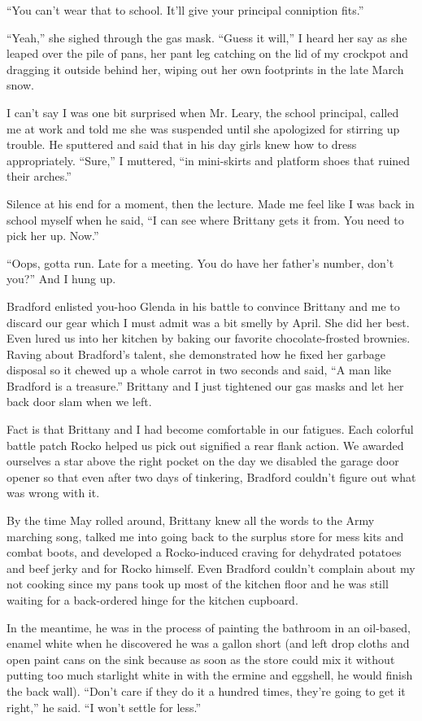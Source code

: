 \documentclass[twoside,10pt]{book}
\begin{document}
``You can't wear that to school. It'll give your principal conniption
fits.''

``Yeah,'' she sighed through the gas mask. ``Guess it will,'' I heard
her say as she leaped over the pile of pans, her pant leg catching on
the lid of my crockpot and dragging it outside behind her, wiping out
her own footprints in the late March snow.

I can't say I was one bit surprised when Mr. Leary, the school
principal, called me at work and told me she was suspended until she
apologized for stirring up trouble. He sputtered and said that in his
day girls knew how to dress appropriately. ``Sure,'' I muttered, ``in
mini-skirts and platform shoes that ruined their arches.''

Silence at his end for a moment, then the lecture. Made me feel like I
was back in school my­self when he said, ``I can see where Brittany gets
it from. You need to pick her up. Now.''

``Oops, gotta run. Late for a meeting. You do have her father's number,
don't you?'' And I hung up.

Bradford enlisted you-hoo Glenda in his battle to convince Brittany and
me to discard our gear which I must admit was a bit smelly by April. She
did her best. Even lured us into her kitchen by baking our favorite
chocolate-frosted brownies. Raving about Bradford's talent, she
demonstrated how he fixed her garbage disposal so it chewed up a whole
carrot in two seconds and said, ``A man like Bradford is a treasure.''
Brittany and I just tightened our gas masks and let her back door slam
when we left.

Fact is that Brittany and I had become comfortable in our fatigues. Each
colorful battle patch Rocko helped us pick out signified a rear flank
action. We awarded ourselves a star above the right pocket on the day we
disabled the garage door opener so that even after two days of
tinkering, Brad­ford couldn't figure out what was wrong with it.

By the time May rolled around, Brittany knew all the words to the Army
marching song, talked me into going back to the surplus store for mess
kits and combat boots, and developed a Rocko-induced craving for
dehydrated potatoes and beef jerky and for Rocko himself. Even Bradford
couldn't complain about my not cooking since my pans took up most of the
kitchen floor and he was still waiting for a back-ordered hinge for the
kitchen cupboard.

In the meantime, he was in the process of painting the bathroom in an
oil-based, enamel white when he discovered he was a gallon short (and
left drop cloths and open paint cans on the sink because as soon as the
store could mix it without putting too much starlight white in with the
ermine and egg­shell, he would finish the back wall). ``Don't care if
they do it a hundred times, they're going to get it right,'' he said.
``I won't settle for less.''
\end{document}
